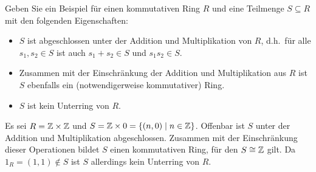 % 
% 


\begin{question}[subtitle = Zur Definition von Unterringen]
  Geben Sie ein Beispiel für einen kommutativen Ring $R$ und eine Teilmenge $S \subseteq R$ mit den folgenden Eigenschaften:
  \begin{itemize}
    \item
      $S$ ist abgeschlossen unter der Addition und Multiplikation von $R$, d.h.\ für alle $s_1, s_2 \in S$ ist auch $s_1 + s_2 \in S$ und $s_1 s_2 \in S$.
    \item
      Zusammen mit der Einschränkung der Addition und Multiplikation aus $R$ ist $S$ ebenfalls ein (notwendigerweise kommutativer) Ring.
    \item
      $S$ ist kein Unterring von $R$.
  \end{itemize}
\end{question}


\begin{solution}
  Es sei $R = \mathbb{Z} \times \mathbb{Z}$ und $S = \mathbb{Z} \times 0 = \{(n,0) \mid n \in \mathbb{Z}\}$.
  Offenbar ist $S$ unter der Addition und Multiplikation abgeschlossen.
  Zusammen mit der Einschränkung dieser Operationen bildet $S$ einen kommutativen Ring, für den $S \cong \mathbb{Z}$ gilt.
  Da $1_R = (1,1) \notin S$ ist $S$ allerdings kein Unterring von $R$.
\end{solution}


